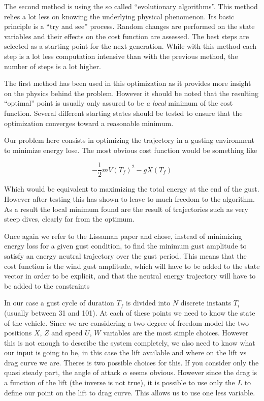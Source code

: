 \par The second method is using the so called ``evolutionary algorithms''. 
This method relies a lot less on knowing the underlying physical phenomenon.
Its basic principle is a ``try and see'' process.
Random changes are performed on the state variables and their effects on the cost function are assessed.
The best steps are selected as a starting point for the next generation.
While with this method each step is a lot less computation intensive than with the previous method, the number of steps is a lot higher.

\par The first method has been used in this optimization as it provides more insight on the physics behind the problem.
However it should be noted that the resulting ``optimal'' point is usually only assured to be \emph{a local} minimum of the cost function.
Several different starting states should be tested to ensure that the optimization converges toward a reasonable minimum.



Our problem here consists in optimizing the trajectory in a gusting environment to minimize energy lose.
The most obvious cost function would be something like

\begin{equation}
  - \frac{1}{2}m{V(T_f)}^2 - gX(T_f)
  \label{eqn:eni_cost_fun}
\end{equation}

Which would be equivalent to maximizing the total energy at the end of the gust.
However after testing this has shown to leave to much freedom to the algorithm. 
As a result the local minimum found are the result of trajectories such as very steep dives, clearly far from the optimum.

\par Once again we refer to the Lissaman paper \cite{Lissaman2007neutral} and chose, instead of minimizing energy loss for a given gust condition, to find the minimum gust amplitude to satisfy an energy neutral trajectory over the gust period.
This means that the cost function is the wind gust amplitude, which will have to be added to the state vector in order to be explicit, and that the neutral energy trajectory will have to be added to the constraints

In our case a gust cycle of duration $T_f$ is divided into $N$ discrete instants $T_i$ (usually between 31 and 101).
At each of these points we need to know the state of the vehicle.
Since we are considering a two degree of freedom model the two positions $X$, $Z$ and speed $U$, $W$ variables are the most simple choices.
However this is not enough to describe the system completely, we also need to know what our input is going to be, in this case the lift available and where on the lift vs drag curve we are.
Theres is two possible choices for this.
If you consider only the quasi steady part, the angle of attack $\alpha$ seems obvious.
However since the drag is a function of the lift (the inverse is not true), it is possible to use only the $L$ to define our point on the lift to drag curve.
This allows us to use one less variable.

